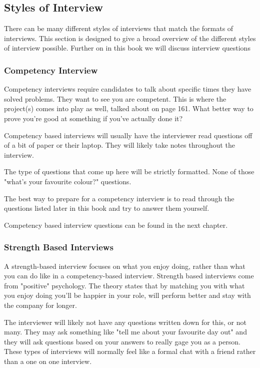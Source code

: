 \documentclass{article}
\begin{document}
\subsection{Styles of Interview}
There can be many different styles of interviews that match the formats
of interviews. This section is designed to give a broad overview of the
different styles of interview possible. Further on in this book we will
discuss interview questions
\subsubsection{Competency Interview}
Competency interviews require candidates to talk about specific times
they have solved problems. They want to see you are competent. This is
where the project(s) comes into play as well, talked about on page 161.
What better way to prove you're good at something if you've actually
done it?

Competency based interviews will usually have the interviewer read
questions off of a bit of paper or their laptop. They will likely take
notes throughout the interview.

The type of questions that come up here will be strictly formatted. None
of those "what's your favourite colour?" questions.

The best way to prepare for a competency interview is to read through
the questions listed later in this book and try to answer them yourself.

Competency based interview questions can be found in the next chapter.

\subsubsection{Strength Based Interviews}
A strength-based interview focuses on what you enjoy doing, rather than
what you can do like in a competency-based interview. Strength based
interviews come from "positive" psychology. The theory states that by
matching you with what you enjoy doing you'll be happier in your role,
will perform better and stay with the company for longer.

The interviewer will likely not have any questions written down for
this, or not many. They may ask something like "tell me about your
favourite day out" and they will ask questions based on your answers to
really gage you as a person. These types of interviews will normally
feel like a formal chat with a friend rather than a one on one
interview.
\end{document}

